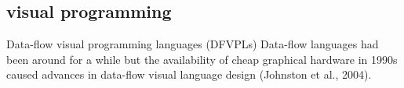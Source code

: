 \subsection{visual programming}

Data-flow visual programming languages (DFVPLs)
Data-flow languages had been around for a while but the availability of cheap graphical
hardware in 1990s caused advances in data-flow visual language design (Johnston et al., 2004).